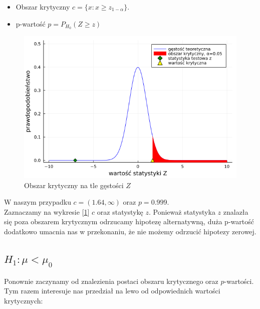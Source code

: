 \documentclass{article}
\theoremstyle{break}
\begin{document}
	\begin{itemize}
		\item Obszar krytyczny $c=\{x: x\geq z_{1-\alpha}\}$.
		\item p-wartość $p=P_{H_0}(Z\geq z)$
	\end{itemize}
	\begin{figure}[H]
	\begin{center}
		\includegraphics[scale=0.5]{Z1.2.png}
		\caption{Obszar krytyczny na tle gęstości $Z$}
		\label{fig:2}
	\end{center}
	\end{figure}
	W naszym przypadku $c=(1.64,\infty)$ oraz $p=0.999$.\\
	Zaznaczamy na wykresie [\ref{fig:2}]  $c$ oraz statystykę $z$. Ponieważ statystyka $z$ znalazła się poza obszarem krytycznym odrzucamy hipotezę alternatywną, duża p-wartość dodatkowo umacnia nas w przekonaniu, że nie możemy odrzucić hipotezy zerowej.
\newpage
\subsection{$H_1: \mu < \mu_0$}

Ponownie zaczynamy od znalezienia postaci obszaru krytycznego oraz $p$-wartości. Tym razem interesuje nas przedział na lewo od odpowiednich wartości krytycznych:
\end{document}
